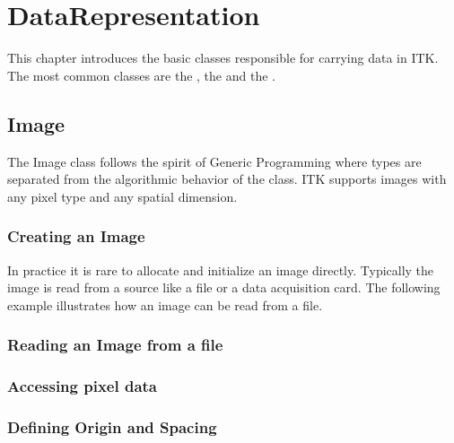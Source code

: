 
\chapter{DataRepresentation}
\label{sec:DataRepresentation}


This chapter introduces the basic classes responsible
for carrying data in ITK. The most common classes are the
,  the  and the .

\section{Image}
\label{sec:ImageSection}

The Image class follows the spirit of Generic Programming where
types are separated from the algorithmic behavior of the class.
ITK supports images with any pixel type and any spatial dimension.

\subsection{Creating an Image}\label{sec:CreatingAnImageSection}




In practice it is rare to allocate and initialize an image directly.
Typically the image is read from a source like a file or a data acquisition
card. The following example illustrates how an image can be read from
a file.




\subsection{Reading an Image from a file}
\label{sec:ReadingImageFromFile}







\subsection{Accessing pixel data}
\label{sec:AccessingImagePixelData}






\subsection{Defining Origin and Spacing}
\label{sec:DefiningImageOriginAndSpacing}

